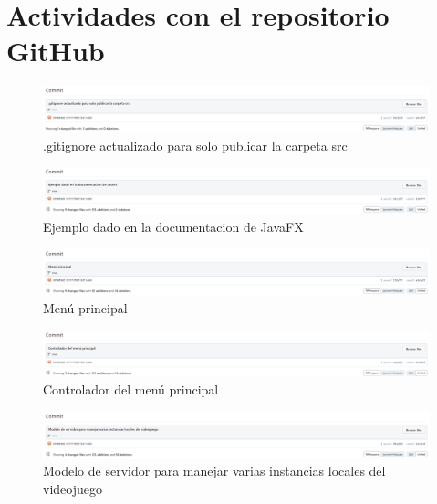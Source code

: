 \documentclass{article}
\begin{document}
\section{Actividades con el repositorio GitHub}

\begin{figure}[H]
	\centering
	\includegraphics[width=1\textwidth,keepaspectratio]{img/commit_01.png}
	\caption{.gitignore actualizado para solo publicar la carpeta src}
\end{figure}
\begin{figure}[H]
	\centering
	\includegraphics[width=1\textwidth,keepaspectratio]{img/commit_02.png}
	\caption{Ejemplo dado en la documentacion de JavaFX}
\end{figure}
\begin{figure}[H]
	\centering
	\includegraphics[width=1\textwidth,keepaspectratio]{img/commit_03.png}
	\caption{Menú principal}
\end{figure}
\begin{figure}[H]
	\centering
	\includegraphics[width=1\textwidth,keepaspectratio]{img/commit_04.png}
	\caption{Controlador del menú principal}
\end{figure}
\begin{figure}[H]
	\centering
	\includegraphics[width=1\textwidth,keepaspectratio]{img/commit_05.png}
	\caption{Modelo de servidor para manejar varias instancias locales del videojuego}
\end{figure}
\end{document}
